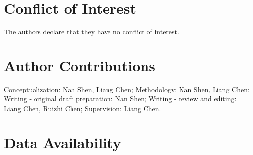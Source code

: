 \documentclass{svjour3}                     %
\begin{document}
%
\section*{Conflict of Interest}
The authors declare that they have no conflict of interest.
\section*{Author Contributions}
Conceptualization: Nan Shen, Liang Chen; Methodology: Nan Shen, Liang Chen; Writing - original draft preparation: Nan Shen; Writing - review and editing: Liang Chen, Ruizhi Chen; Supervision: Liang Chen.
 \section*{Data Availability}



\end{document}
